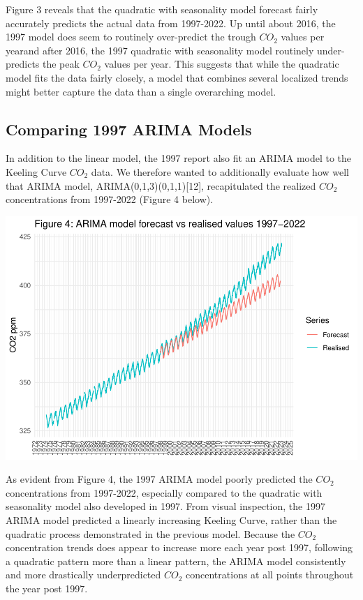\documentclass[AER]{AEA}
\begin{document}
Figure 3 reveals that the quadratic with seasonality model forecast
fairly accurately predicts the actual data from 1997-2022. Up until
about 2016, the 1997 model does seem to routinely over-predict the
trough \(CO_{2}\) values per yearand after 2016, the 1997 quadratic with
seasonality model routinely under-predicts the peak \(CO_{2}\) values
per year. This suggests that while the quadratic model fits the data
fairly closely, a model that combines several localized trends might
better capture the data than a single overarching model.

\hypertarget{comparing-1997-arima-models}{%
\subsection{Comparing 1997 ARIMA
Models}\label{comparing-1997-arima-models}}

In addition to the linear model, the 1997 report also fit an ARIMA model
to the Keeling Curve \(CO_{2}\) data. We therefore wanted to
additionally evaluate how well that ARIMA model,
ARIMA(0,1,3)(0,1,1){[}12{]}, recapitulated the realized \(CO_{2}\)
concentrations from 1997-2022 (Figure 4 below).

\includegraphics{co2_present_files/figure-latex/Compare against the realised values ARIMA-1.pdf}

As evident from Figure 4, the 1997 ARIMA model poorly predicted the
\(CO_{2}\) concentrations from 1997-2022, especially compared to the
quadratic with seasonality model also developed in 1997. From visual
inspection, the 1997 ARIMA model predicted a linearly increasing Keeling
Curve, rather than the quadratic process demonstrated in the previous
model. Because the \(CO_{2}\) concentration trends does appear to
increase more each year post 1997, following a quadratic pattern more
than a linear pattern, the ARIMA model consistently and more drastically
underpredicted \(CO_{2}\) concentrations at all points throughout the
year post 1997.
\end{document}
